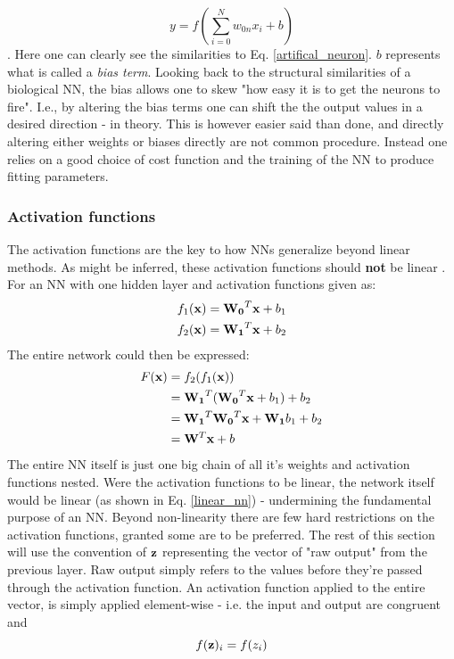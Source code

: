 \begin{equation}
    y = f\left( \sum_{i=0}^N w_{0n}x_i + b\right)
\end{equation}
\citep[p.17]{Ketkar2017}. Here one can clearly see the similarities to Eq. \ref{artifical_neuron}. $b$ represents what is called a \textit{bias term}. Looking back to the structural similarities of a biological NN, the bias allows one to skew "how easy it is to get the neurons to fire". I.e., by altering the bias terms one can shift the the output values in a desired direction - in theory. This is however easier said than done, and directly altering either weights or biases directly are not common procedure. Instead one relies on a good choice of cost function and the training of the NN to produce fitting parameters. 


\subsubsection{Activation functions}\label{sec:activation_func}

The activation functions are the key to how NNs generalize beyond linear methods. As might be inferred, these activation functions should \textbf{not} be linear \citep[p.168]{Goodfellow-et-al-2016}. 
For an NN with one hidden layer and activation functions given as:
\begin{align}
\begin{split}
    f_1(\bold{x})&=\bold{W_0}^T\bold{x} + b_1 \\
    f_2(\bold{x})&=\bold{W_1}^T\bold{x} + b_2 
\end{split}
\end{align}
The entire network could then be expressed: 
\begin{align}\label{linear_nn}
    \begin{split}
        F(\bold{x})&=f_2(f_1(\bold{x})) \\
        &= \bold{W_1}^T(\bold{W_0}^T\bold{x} + b_1) + b_2 \\
        &= \bold{W_1}^T\bold{W_0}^T\bold{x}+\bold{W_1}b_1+b_2 \\
        &=\bold{W}^T\bold{x}+b
    \end{split}
\end{align}
The entire NN itself is just one big chain of all it's weights and activation functions nested. Were the activation functions to be linear, the network itself would be linear (as shown in Eq. \ref{linear_nn}) - undermining the fundamental purpose of an NN. 
Beyond non-linearity there are few hard restrictions on the activation functions, granted some are to be preferred.
The rest of this section will use the convention of $\bold{z}$ representing the vector of "raw output" from the previous layer. Raw output simply refers to the values before they're passed through the activation function. An activation function applied to the entire vector, is simply applied element-wise - i.e. the input and output are congruent and
\begin{equation}
    f(\bold{z})_i = f(z_i)
\end{equation}


